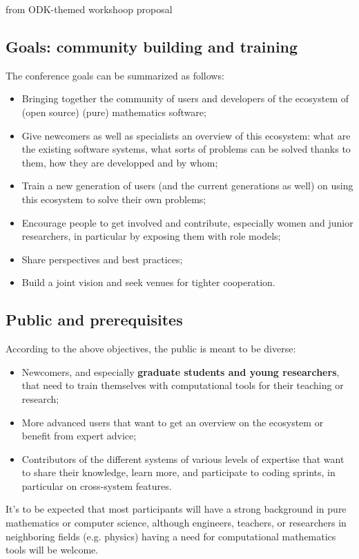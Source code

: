 \begin{oldpart}{from ODK-themed workshoop proposal}
\subsection{Goals: community building and training}

The conference goals can be summarized as follows:

\begin{itemize}
\item Bringing together the community of users and developers of the
  ecosystem of (open source) (pure) mathematics software;
\item Give newcomers as well as specialists an overview of this
  ecosystem: what are the existing software systems, what sorts of
  problems can be solved thanks to them, how they are developped and
  by whom;
\item Train a new generation of users (and the current generations as
  well) on using this ecosystem to solve their own problems;
\item Encourage people to get involved and contribute, especially
  women and junior researchers, in particular by exposing them with role models;
\item Share perspectives and best practices;
\item Build a joint vision and
  seek venues for tighter cooperation.
\end{itemize}

\subsection{Public and prerequisites}

According to the above objectives, the public is meant to be diverse:
\begin{itemize}
\item Newcomers, and especially \textbf{graduate students and young
    researchers}, that need to train themselves with computational
  tools for their teaching or research;
\item More advanced users that want to get an overview on the
  ecosystem or benefit from expert advice;
\item Contributors of the different systems of various levels of
  expertise that want to share their knowledge, learn more, and
  participate to coding sprints, in particular on cross-system
  features.
\end{itemize}

It's to be expected that most participants will have a strong
background in pure mathematics or computer science, although
engineers, teachers, or researchers in neighboring fields (e.g. physics)
having a need for computational mathematics tools will be
welcome.


\end{oldpart}
